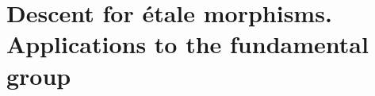 \documentclass[../main.tex]{subfiles}
\begin{document}
\setcounter{chapter}{8}
\chapter{Descent for étale morphisms. Applications to the fundamental group}
\end{document}
